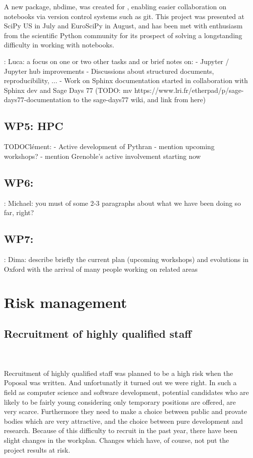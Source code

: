 \documentclass{deliverablereport}
\newcommand{\TODO}[1]{{\color{red}{TODO}: #1}}
\begin{document}
A new \Jupyter package, nbdime, was created for ,
enabling easier collaboration on notebooks via version control systems such as git.
This project was presented at SciPy US in July and EuroSciPy in August,
and has been met with enthusiasm from the scientific Python community
for its prospect of solving a longstanding difficulty in working with notebooks.

\TODO{Luca: a focus on one or two other tasks and or brief notes on:
- Jupyter / Jupyter hub improvements
- Discussions about structured documents, reproducibility, ...
- Work on Sphinx documentation started in collaboration with Sphinx
  dev and Sage Days 77 (TODO: mv
  https://www.lri.fr/etherpad/p/sage-days77-documentation to the
  sage-days77 wiki, and link from here)
}
\subsection{WP5: HPC}

TODO{Clément:
- Active development of Pythran
- mention upcoming workshops?
- mention Grenoble's active involvement starting now}

\subsection{WP6: }

\TODO{Michael: you must of some 2-3 paragraphs about what we have
been doing so far, right?}

\subsection{WP7: }

\TODO{Dima: describe briefly the current plan (upcoming workshops)
and evolutions in Oxford with the arrival of many people working on
related areas}

\section{Risk management}
\subsection{Recruitment of highly qualified staff}
 ~\\~\\Recruitment of highly qualified staff was planned to be a high risk when the Poposal was written. And unfortunatly it turned out we were right. In such a field as computer science and software development, potential candidates who are likely to be fairly young considering only temporary positions are offered, are very scarce. Furthermore they need to make a choice between public and provate bodies which are very attractive, and the choice between pure development and research.
Because of this difficulty to recruit in the past year, there have been slight changes in the workplan. Changes which have, of course, not put the project results at risk.
\end{document}
